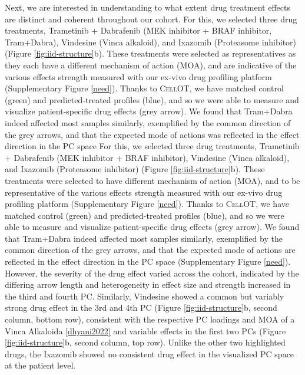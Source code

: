 Next, we are interested in understanding to what extent drug treatment effects are distinct and coherent throughout our cohort.
For this, we selected three drug treatments, Trametinib + Dabrafenib (MEK inhibitor + BRAF inhibitor, Tram+Dabra), Vindesine (Vinca alkaloid), and Ixazomib (Proteasome inhibitor) (Figure \ref{fig:iid-structure}b).
These treatments were selected as representatives as they each have a different mechanism of action (MOA), and are indicative of the various effects strength measured with our ex-vivo drug profiling platform (Supplementary Figure \ref{need}).
Thanks to \textsc{CellOT}, we have matched control (green) and predicted-treated profiles (blue), and so we were able to measure and visualize patient-specific drug effects (grey arrow).
 We found that Tram+Dabra indeed affected most samples similarly, exemplified by the common direction of the grey arrows, and that the expected mode of actions was reflected in the effect direction in the PC space 
 For this, we selected three drug treatments, Trametinib + Dabrafenib (MEK inhibitor + BRAF inhibitor), Vindesine (Vinca alkaloid), and Ixazomib (Proteasome inhibitor) (Figure \ref{fig:iid-structure}b).
 These treatments were selected to have different mechanism of action (MOA), and to be representative of the various effects strength measured with our ex-vivo drug profiling platform (Supplementary Figure \ref{need}).
Thanks to \textsc{CellOT}, we have matched control (green) and predicted-treated profiles (blue), and so we were able to measure and visualize patient-specific drug effects (grey arrow).
 We found that Tram+Dabra indeed affected most samples similarly, exemplified by the common direction of the grey arrows, and that the expected mode of actions \cite{subbiah2020} are reflected in the effect direction in the PC space (Supplementary Figure \ref{need}).
 However, the severity of the drug effect varied across the cohort, indicated by the differing arrow length and heterogeneity in effect size and strength increased in the third and fourth PC.
 Similarly, Vindesine showed a common but variably strong drug effect in the 3rd and 4th PC (Figure \ref{fig:iid-structure}b, second column, bottom row), consistent with the respective PC loadings and MOA of a Vinca Alkaloida \ref{dhyani2022} and variable effects in the first two PCs (Figure \ref{fig:iid-structure}b, second column, top row).
 Unlike the other two highlighted drugs, the Ixazomib showed no consistent drug effect in the visualized PC space at the patient level.  

